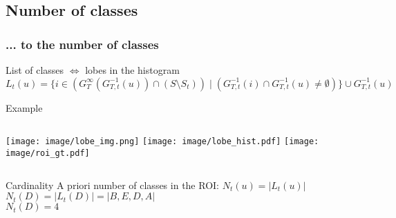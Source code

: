 	\subsection[Number of lobes]{Number of classes}
		\begin{frame}
			\frametitle{... to the number of classes}
			\begin{block}{List of classes $\Leftrightarrow$ lobes in the histogram}
				\begin{equation}
			 	  	L_t(u) = \Big\{ i \in \left( G_T^{\infty}(G_{T,t}^{-1} (u)) \cap ( S \setminus S_t ) \right) \;|\; \left( G_{T,t}^{-1} (i) \cap G_{T,t}^{-1} (u) \neq \emptyset \right) \Big\} \cup  G_{T,t}^{-1}(u)
				\end{equation}
			\end{block}			

			\begin{exampleblock}{Example}
				\begin{columns}[c]
					\column{5em}
					\texttt{[image: image/lobe\_img.png]}
					\column{5em}
					\texttt{[image: image/lobe\_hist.pdf]}
					\column{5em}
					\texttt{[image: image/roi\_gt.pdf]}
				\end{columns}
			\end{exampleblock}

			\begin{columns}[c]	
				\column{18em}			

				\begin{alertblock}{Cardinality}
					A priori number of classes in the ROI:
					$ N_t(u) = \left|{L_t(u)}\right|$\\
					$ N_t(D) = \left|{L_t(D)}\right| = \left|{B,E,D,A}\right|$\\
					$ N_t(D) = 4$

				\end{alertblock}
				

\end{columns}
\end{frame}
